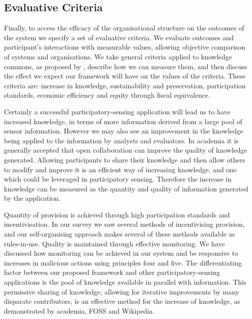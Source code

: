 \begin{itemize}
\end{itemize}

\subsection{Evaluative Criteria}

Finally, to access the efficacy of the organisational structure on the outcomes of the system we specify a set of evaluative criteria. 
We evaluate outcomes and participant's interactions with measurable values, allowing objective comparison of systems and organisations. 
We take general criteria applied to knowledge commons, as proposed by , describe how we can measure them, and then discuss the effect we expect our framework will have on the values of the criteria. 
These criteria are: increase in knowledge, sustainability and preservation, participation standards, economic efficiency and equity through fiscal equivalence.

Certainly a successful participatory-sensing application will lead us to have increased knowledge, in terms of more information derived from a large pool of sensor information. 
However we may also see an improvement in the knowledge being applied to the information by analysts and evaluators. In academia it is generally accepted that open collaboration can improve the quality of knowledge generated. Allowing participants to share their knowledge and then allow others to modify and improve it is an efficient way of increasing knowledge, and one which could be leveraged in participatory sensing. Therefore the increase in knowledge can be measured as the quantity and quality of information generated by the application.

Quantity of provision is achieved through high participation standards and incentivisation. 
In our survey we saw several methods of incentivising provision, and our self-organising approach makes several of these methods available as rules-in-use. 
Quality is maintained through effective monitoring. 
We have discussed how monitoring can be achieved in our system and be responsive to increases in malicious actions using principles four and five. 
The differentiating factor between our proposed framework and other participatory-sensing applications is the pool of knowledge available in parallel with information. This permissive sharing of knowledge, allowing for iterative improvements by many disparate contributors, is an effective method for the increase of knowledge, as demonstrated by academia, \ac{FOSS} and Wikipedia.

